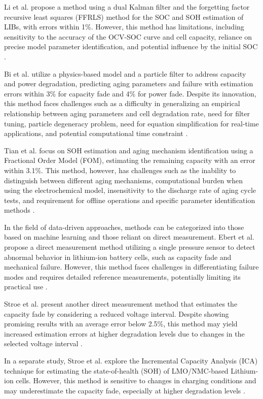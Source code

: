 \documentclass[energies,article,accept,pdftex,moreauthors]{Definitions/mdpi}
\begin{document}
Li et al. propose a method using a dual Kalman filter and the forgetting factor recursive least squares (FFRLS) method for the SOC and SOH estimation of LIBs, with errors within 1\%. However, this method has limitations, including sensitivity to the accuracy of the OCV-SOC curve and cell capacity, reliance on precise model parameter identification, and potential influence by the initial SOC \cite{Li.2021}.

Bi et al. utilize a physics-based model and a particle filter to address capacity and power degradation, predicting aging parameters and failure with estimation errors within 3\% for capacity fade and 4\% for power fade. Despite its innovation, this method faces challenges such as a difficulty in generalizing an empirical relationship between aging parameters and cell degradation rate, need for filter tuning, particle degeneracy problem, need for equation simplification for real-time applications, and potential computational time constraint \cite{Bi.2020}.

Tian et al. focus on SOH estimation and aging mechanism identification using a Fractional Order Model (FOM), estimating the remaining capacity with an error within 3.1\%. This method, however, has challenges such as the inability to distinguish between different aging mechanisms, computational burden when using the electrochemical model, insensitivity to the discharge rate of aging cycle tests, and requirement for offline operations and specific parameter identification methods \cite{Tian.2019}.

In the field of data-driven approaches, methods can be categorized into those based on machine learning and those reliant on direct measurement. Ebert et al. propose a direct measurement method utilizing a single pressure sensor to detect abnormal behavior in lithium-ion battery cells, such as capacity fade and mechanical failure. However, this method faces challenges in differentiating failure modes and requires detailed reference measurements, potentially limiting its practical use \cite{Ebert.2017}.

Stroe et al. present another direct measurement method that estimates the capacity fade by considering a reduced voltage interval. Despite showing promising results with an average error below 2.5\%, this method may yield increased estimation errors at higher degradation levels due to changes in the selected voltage interval \cite{Stroe.2018b}.

In a separate study, Stroe et al. explore the Incremental Capacity Analysis (ICA) technique for estimating the state-of-health (SOH) of LMO/NMC-based Lithium-ion cells. However, this method is sensitive to changes in charging conditions and may underestimate the capacity fade, especially at higher degradation levels \cite{Stroe.2018}.
\end{document}
